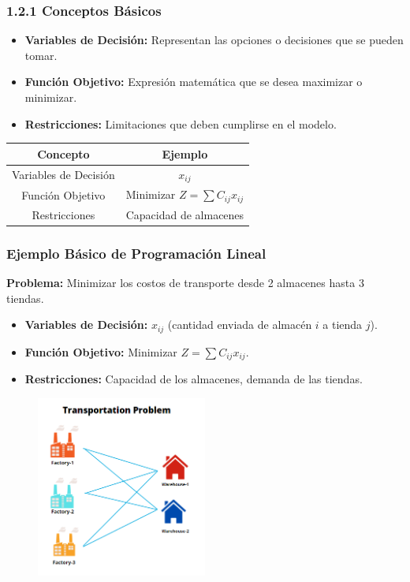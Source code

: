 \documentclass{beamer}
\begin{document}
\begin{frame}
    \frametitle{1.2.1 Conceptos Básicos}
    \begin{itemize}
        \item \textbf{Variables de Decisión:} Representan las opciones o decisiones que se pueden tomar.
        \item \textbf{Función Objetivo:} Expresión matemática que se desea maximizar o minimizar.
        \item \textbf{Restricciones:} Limitaciones que deben cumplirse en el modelo.
    \end{itemize}
    \begin{table}[]
        \centering
        \begin{tabular}{|c|c|}
            \hline
            \textbf{Concepto} & \textbf{Ejemplo} \\ \hline
            Variables de Decisión & \(x_{ij}\) \\ \hline
            Función Objetivo & Minimizar \(Z = \sum C_{ij} x_{ij}\) \\ \hline
            Restricciones & Capacidad de almacenes \\ \hline
        \end{tabular}
    \end{table}
\end{frame}

\begin{frame}
    \frametitle{Ejemplo Básico de Programación Lineal}
    \textbf{Problema:} Minimizar los costos de transporte desde 2 almacenes hasta 3 tiendas.
    \begin{itemize}
        \item \textbf{Variables de Decisión:} \(x_{ij}\) (cantidad enviada de almacén \(i\) a tienda \(j\)).
        \item \textbf{Función Objetivo:} Minimizar \(Z = \sum C_{ij} x_{ij}\).
        \item \textbf{Restricciones:} Capacidad de los almacenes, demanda de las tiendas.
    \end{itemize}
    \begin{figure}
        \centering
        \includegraphics[width=0.5\textwidth]{images/transportation_problem.png} %
    \end{figure}
\end{frame}
\end{document}
